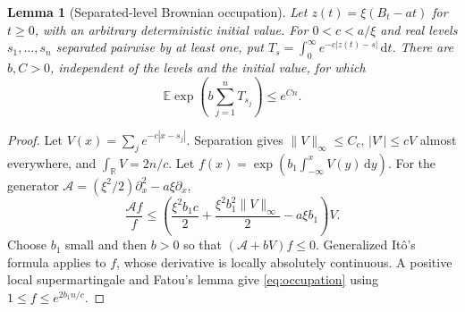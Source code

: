 \documentclass[11pt,reqno]{amsart}
\theoremstyle{plain}
\newtheorem{lemma}[theorem]{Lemma}
\theoremstyle{definition}
\theoremstyle{remark}
\newcommand{\R}{\mathbb R}
\newcommand{\E}{\mathbb E}
\newcommand{\1}{\mathbf{1}}
\newcommand{\dd}{\,\mathrm d}
\begin{document}
\begin{lemma}[Separated-level Brownian occupation]\label{lem:occupation}
Let $z(t)=\xi(B_t-at)$ for $t\ge0$, with an arbitrary deterministic initial value. For $0<c<a/\xi$ and real levels $s_1,\ldots,s_n$ separated pairwise by at least one, put
$T_s=\int_0^\infty e^{-c|z(t)-s|}\dd t$. There are $b,C>0$, independent of the levels and the initial value, for which
\begin{equation}\label{eq:occupation}
\E\exp\left(b\sum_{j=1}^nT_{s_j}\right)\le e^{Cn}.
\end{equation}
\end{lemma}
\begin{proof}
Let $V(x)=\sum_j e^{-c|x-s_j|}$. Separation gives $\|V\|_\infty\le C_c$, $|V'|\le cV$ almost everywhere, and $\int_\R V=2n/c$. Let $f(x)=\exp(b_1\int_{-\infty}^xV(y)\dd y)$. For the generator $\mathcal A=(\xi^2/2)\partial_x^2-a\xi\partial_x$,
\[
\frac{\mathcal Af}{f}\le\left(\frac{\xi^2b_1c}{2}+\frac{\xi^2b_1^2\|V\|_\infty}{2}-a\xi b_1\right)V.
\]
Choose $b_1$ small and then $b>0$ so that $(\mathcal A+bV)f\le0$. Generalized It\^o's formula applies to $f$, whose derivative is locally absolutely continuous. A positive local supermartingale and Fatou's lemma give \eqref{eq:occupation} using $1\le f\le e^{2b_1n/c}$.
\end{proof}
\end{document}
